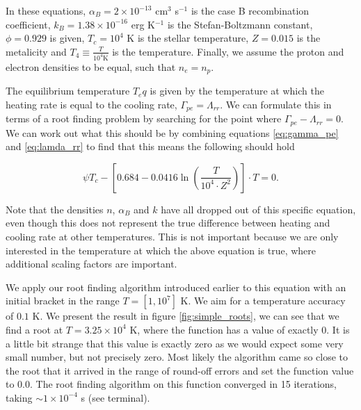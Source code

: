 In these equations, $\alpha_B = 2 \times 10^{-13}$ cm$^3$ s$^{-1}$ is the case B recombination coefficient, $k_B = 1.38\times 10^{-16}$ erg K$^{-1}$ is the Stefan-Boltzmann constant, $\phi = 0.929$ is given, $T_c = 10^4$ K is the stellar temperature, $Z = 0.015$ is the metalicity and $T_4 \equiv \frac{T}{10^4\text{K}}$ is the temperature. Finally, we assume the proton and electron densities to be equal, such that $n_e = n_p$.

The equilibrium temperature $T_eq$ is given by the temperature at which the heating rate is equal to the cooling rate, $\Gamma_{pe} = \Lambda_{rr}$. We can formulate this in terms of a root finding problem by searching for the point where $\Gamma_{pe} - \Lambda_{rr} = 0$. We can work out what this should be by combining equations \ref{eq:gamma_pe} and \ref{eq:lamda_rr} to find that this means the following should hold

\begin{equation}
    \psi T_c - \left[0.684 - 0.0416\ln\left(\frac{T}{10^4\cdot Z^2}\right)\right] \cdot T = 0.
\end{equation}

Note that the densities $n$, $\alpha_B$ and $k$ have all dropped out of this specific equation, even though this does not represent the true difference between heating and cooling rate at other temperatures. This is not important because we are only interested in the temperature at which the above equation is true, where additional scaling factors are important.

We apply our root finding algorithm introduced earlier to this equation with an initial bracket in the range $T = \left[1, 10^7\right]$ K. We aim for a temperature accuracy of $0.1$ K. We present the result in figure \ref{fig:simple_roots}, we can see that we find a root at $T = 3.25 \times 10^4$ K, where the function has a value of exactly $0$. It is a little bit strange that this value is exactly zero as we would expect some very small number, but not precisely zero. Most likely the algorithm came so close to the root that it arrived in the range of round-off errors and set the function value to $0.0$. The root finding algorithm on this function converged in 15 iterations, taking $\sim 1 \times 10^{-4}$ s (see terminal).


